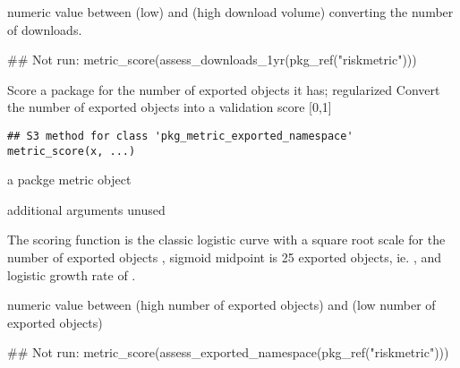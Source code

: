 \documentclass[a4paper]{book}
\begin{document}
%
\begin{Value}
numeric value between  (low) and  (high download
volume) converting the number of downloads.
\end{Value}
%
\begin{Examples}
\begin{ExampleCode}
## Not run: metric_score(assess_downloads_1yr(pkg_ref("riskmetric")))

\end{ExampleCode}
\end{Examples}
%
\begin{Description}
Score a package for the number of exported objects it has; regularized
Convert the number of exported objects  into a validation
score [0,1] 
\end{Description}
%
\begin{Usage}
\begin{verbatim}
## S3 method for class 'pkg_metric_exported_namespace'
metric_score(x, ...)
\end{verbatim}
\end{Usage}
%
\begin{Arguments}
\begin{ldescription}
\item[\code{x}] a  packge metric object

\item[\code{...}] additional arguments unused
\end{ldescription}
\end{Arguments}
%
\begin{Details}
The scoring function is the classic logistic curve  with a square root scale for the number of exported objects
, sigmoid midpoint is 25 exported objects, ie. , and logistic growth rate of .

\end{Details}
%
\begin{Value}
numeric value between  (high number of exported objects) and
 (low number of exported objects)
\end{Value}
%
\begin{Examples}
\begin{ExampleCode}
## Not run: metric_score(assess_exported_namespace(pkg_ref("riskmetric")))

\end{ExampleCode}
\end{Examples}
\end{document}
